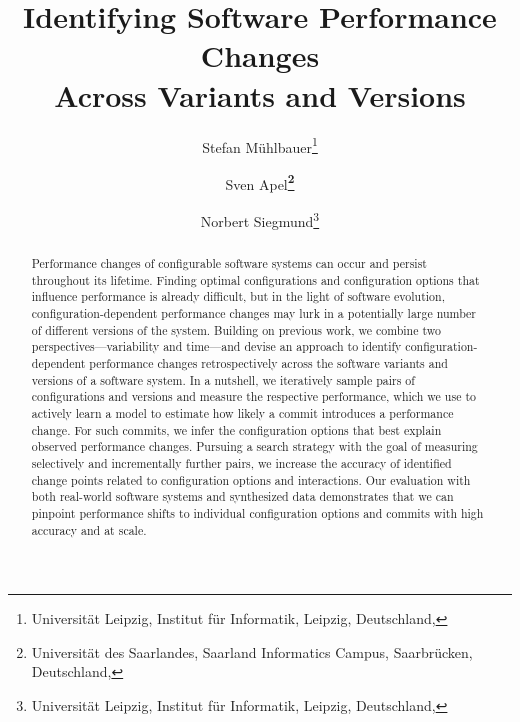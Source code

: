 \documentclass[utf8,biblatex]{lni}
\begin{document}
\title[Identifying Software Performance Changes Across Variants and Versions]{Identifying Software Performance Changes\\ Across Variants and Versions}
\author[Stefan Mühlbauer \and Sven Apel \and Norbert Siegmund]
{Stefan Mühlbauer\footnote{Universität Leipzig, Institut für Informatik, Leipzig, Deutschland, } \and
Sven Apel\textbf{\footnote{Universität des Saarlandes, Saarland Informatics Campus, Saarbrücken, Deutschland, }} \and
Norbert Siegmund\footnote{Universität Leipzig, Institut für Informatik, Leipzig, Deutschland, }
}
\maketitle

\begin{abstract}
Performance changes of configurable software systems can occur and persist throughout its lifetime. Finding optimal configurations and configuration options that influence performance is already difficult, but in the light of software evolution, configuration-dependent performance changes may lurk in a potentially large number of different versions of the system. 
Building on previous work, we combine two perspectives---variability and time---and devise an approach to identify configuration-dependent performance changes retrospectively across the software variants and versions of a software system. In a nutshell, we iteratively sample pairs of configurations and versions and measure the respective performance, which we use to actively learn a model to estimate how likely a commit introduces a performance change. For such commits, we infer the configuration options that best explain observed performance changes. 
Pursuing a search strategy with the goal of measuring selectively and incrementally further pairs, we increase the accuracy of identified change points related to configuration options and interactions.
Our evaluation with both real-world software systems and synthesized data demonstrates that we can pinpoint performance shifts to individual configuration options and commits with high accuracy and at scale. 
\end{abstract}
\end{document}
